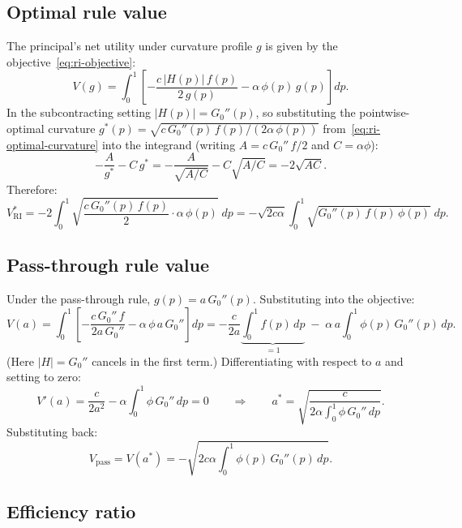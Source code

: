 \documentclass[11pt]{article}
\begin{document}
\subsection{Optimal rule value}

The principal's net utility under curvature profile $g$ is given by the objective~\eqref{eq:ri-objective}:
\[
V(g) = \int_0^1 \left[-\frac{c\,|H(p)|\,f(p)}{2\,g(p)} - \alpha\,\phi(p)\,g(p)\right] dp.
\]
In the subcontracting setting $|H(p)| = G_0''(p)$, so substituting the pointwise-optimal curvature $g^*(p) = \sqrt{c\,G_0''(p)\,f(p)/(2\alpha\,\phi(p))}$ from~\eqref{eq:ri-optimal-curvature} into the integrand (writing $A = c\,G_0''\,f/2$ and $C = \alpha\phi$):
\[
-\frac{A}{g^*} - C\,g^* = -\frac{A}{\sqrt{A/C}} - C\sqrt{A/C} = -2\sqrt{AC}.
\]
Therefore:
\begin{equation}\label{eq:ri-V-opt}
V^*_{\mathrm{RI}} = -2\int_0^1 \sqrt{\frac{c\,G_0''(p)\,f(p)}{2} \cdot \alpha\,\phi(p)} \; dp = -\sqrt{2c\alpha} \int_0^1 \sqrt{G_0''(p)\,f(p)\,\phi(p)} \; dp.
\end{equation}

\subsection{Pass-through rule value}

Under the pass-through rule, $g(p) = a\,G_0''(p)$. Substituting into the objective:
\[
V(a) = \int_0^1 \left[-\frac{c\,G_0''\,f}{2a\,G_0''} - \alpha\,\phi\,a\,G_0''\right]dp = -\frac{c}{2a}\underbrace{\int_0^1 f(p)\,dp}_{= 1} \;-\; \alpha\,a\int_0^1 \phi(p)\,G_0''(p)\,dp.
\]
(Here $|H| = G_0''$ cancels in the first term.) Differentiating with respect to $a$ and setting to zero:
\[
V'(a) = \frac{c}{2a^2} - \alpha\int_0^1 \phi\,G_0''\,dp = 0 \qquad\Longrightarrow\qquad a^* = \sqrt{\frac{c}{2\alpha\int_0^1 \phi\,G_0''\,dp}}.
\]
Substituting back:
\[
V_{\mathrm{pass}} = V(a^*) = -\sqrt{2c\alpha\int_0^1 \phi(p)\,G_0''(p)\,dp}.
\]

\subsection{Efficiency ratio}\label{sec:efficiency}
\end{document}
